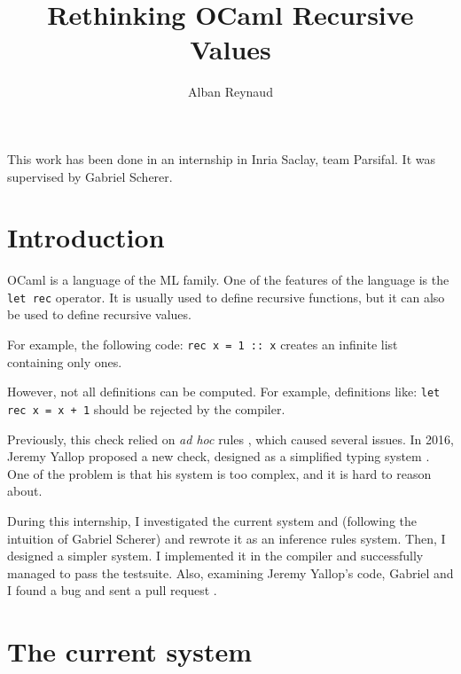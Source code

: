 \documentclass{article}
\title{Rethinking OCaml Recursive Values}
\author{Alban Reynaud}
\date{}
\begin{document}
\maketitle

This work has been done in an internship in Inria Saclay, team Parsifal. It was
supervised by Gabriel Scherer.


\section{Introduction}
OCaml is a
language of the ML family. One of the features of the language is the
\lstinline|let rec| operator. It is usually used to define recursive
functions, but it can also be used to define recursive values.

For example, the following code: \lstinline|rec x = 1 :: x|
creates an infinite list containing only ones.

However, not all definitions can be computed. For example, definitions like:
\lstinline|let rec x = x + 1| should be rejected by the compiler.

Previously, this check relied on \textit{ad hoc} rules \cite{PreviousRules},
which caused several issues. In 2016, Jeremy Yallop proposed a new check,
designed as a simplified typing system \cite{Yallop}. One of the problem is that
his system is too complex, and it is hard to reason about.

During this internship, I investigated the current system and (following the
intuition of Gabriel Scherer) and rewrote it as an inference rules system. Then,
I designed a simpler system. I implemented it in the compiler and successfully
managed to pass the testsuite. Also, examining Jeremy Yallop's code, Gabriel and
I found a bug and sent a pull request
.

\section{The current system}
\end{document}
